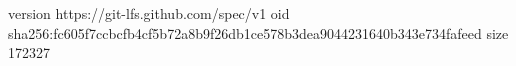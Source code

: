 version https://git-lfs.github.com/spec/v1
oid sha256:fc605f7ccbcfb4cf5b72a8b9f26db1ce578b3dea9044231640b343e734fafeed
size 172327

